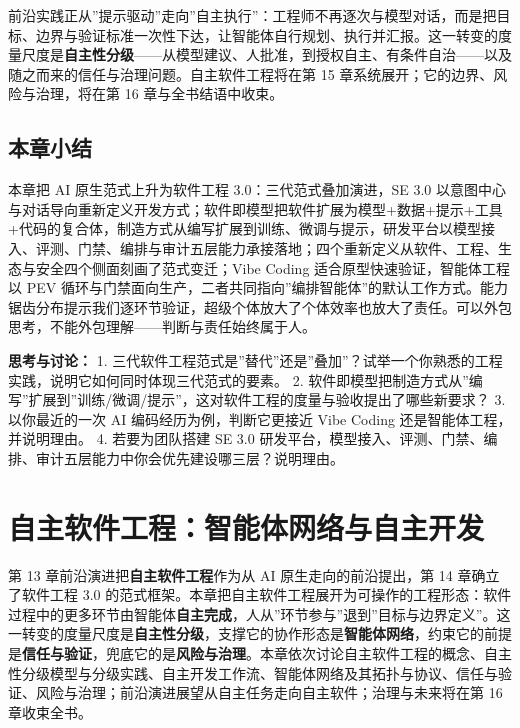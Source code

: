 \documentclass[
]{ctexbook}
\begin{document}
前沿实践正从''提示驱动''走向''自主执行''：工程师不再逐次与模型对话，而是把目标、边界与验证标准一次性下达，让智能体自行规划、执行并汇报。这一转变的度量尺度是\textbf{自主性分级}------从模型建议、人批准，到授权自主、有条件自治------以及随之而来的信任与治理问题。自主软件工程将在第
15 章系统展开；它的边界、风险与治理，将在第 16 章与全书结语中收束。

\section{本章小结}\label{ux672cux7ae0ux5c0fux7ed3-13}

本章把 AI 原生范式上升为软件工程 3.0：三代范式叠加演进，SE 3.0
以意图中心与对话导向重新定义开发方式；软件即模型把软件扩展为模型+数据+提示+工具+代码的复合体，制造方式从编写扩展到训练、微调与提示，研发平台以模型接入、评测、门禁、编排与审计五层能力承接落地；四个重新定义从软件、工程、生态与安全四个侧面刻画了范式变迁；Vibe
Coding 适合原型快速验证，智能体工程以 PEV
循环与门禁面向生产，二者共同指向''编排智能体''的默认工作方式。能力锯齿分布提示我们逐环节验证，超级个体放大了个体效率也放大了责任。可以外包思考，不能外包理解------判断与责任始终属于人。

\textbf{思考与讨论：} 1.
三代软件工程范式是''替代''还是''叠加''？试举一个你熟悉的工程实践，说明它如何同时体现三代范式的要素。
2.
软件即模型把制造方式从''编写''扩展到''训练/微调/提示''，这对软件工程的度量与验收提出了哪些新要求？
3. 以你最近的一次 AI 编码经历为例，判断它更接近 Vibe Coding
还是智能体工程，并说明理由。 4. 若要为团队搭建 SE 3.0
研发平台，模型接入、评测、门禁、编排、审计五层能力中你会优先建设哪三层？说明理由。

\chapter{自主软件工程：智能体网络与自主开发}\label{ux81eaux4e3bux8f6fux4ef6ux5de5ux7a0bux667aux80fdux4f53ux7f51ux7edcux4e0eux81eaux4e3bux5f00ux53d1}

第 13 章前沿演进把\textbf{自主软件工程}作为从 AI 原生走向的前沿提出，第
14 章确立了软件工程 3.0
的范式框架。本章把自主软件工程展开为可操作的工程形态：软件过程中的更多环节由智能体\textbf{自主完成}，人从''环节参与''退到''目标与边界定义''。这一转变的度量尺度是\textbf{自主性分级}，支撑它的协作形态是\textbf{智能体网络}，约束它的前提是\textbf{信任与验证}，兜底它的是\textbf{风险与治理}。本章依次讨论自主软件工程的概念、自主性分级模型与分级实践、自主开发工作流、智能体网络及其拓扑与协议、信任与验证、风险与治理；前沿演进展望从自主任务走向自主软件；治理与未来将在第
16 章收束全书。
\end{document}
